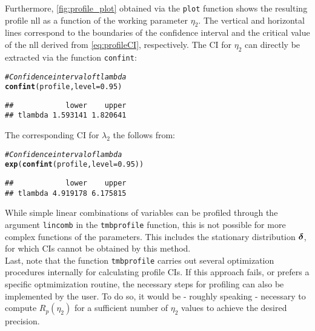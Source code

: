 \documentclass[bimj,fleqn]{w-art}\usepackage[]{graphicx}\usepackage[]{color}
\makeatletter
\newcommand{\hlnum}[1]{\textcolor[rgb]{0.686,0.059,0.569}{#1}}%
\newcommand{\hlcom}[1]{\textcolor[rgb]{0.678,0.584,0.686}{\textit{#1}}}%
\newcommand{\hlstd}[1]{\textcolor[rgb]{0.345,0.345,0.345}{#1}}%
\newcommand{\hlkwc}[1]{\textcolor[rgb]{0.333,0.667,0.333}{#1}}%
\newcommand{\hlkwd}[1]{\textcolor[rgb]{0.737,0.353,0.396}{\textbf{#1}}}%
\newenvironment{kframe}{%
 \def\at@end@of@kframe{}%
 \ifinner\ifhmode%
  \def\at@end@of@kframe{\end{minipage}}%
  \begin{minipage}{\columnwidth}%
 \fi\fi%
 \def\FrameCommand##1{\hskip\@totalleftmargin \hskip-\fboxsep
 \colorbox{shadecolor}{##1}\hskip-\fboxsep
     \hskip-\linewidth \hskip-\@totalleftmargin \hskip\columnwidth}%
 \MakeFramed {\advance\hsize-\width
   \@totalleftmargin\z@ \linewidth\hsize
   \@setminipage}}%
 {\par\unskip\endMakeFramed%
 \at@end@of@kframe}
\newenvironment{knitrout}{}{} %
\newcommand{\bfdelta}{\mbox{\boldmath $\delta$}}
\theoremstyle{plain}
\theoremstyle{definition}
\makeatother
\begin{document}
Furthermore, \autoref{fig:profile_plot} obtained via the \texttt{plot} function shows the resulting profile nll as a function of the working parameter $\eta_2$. The vertical and horizontal lines correspond to the boundaries of the confidence interval and the critical value of the nll derived from \autoref{eq:profileCI}, respectively. The CI for $\eta_2$ can directly be extracted via the function \texttt{confint}:
\begin{knitrout}
\color{fgcolor}\begin{kframe}
\begin{alltt}
\hlcom{# Confidence interval of tlambda}
\hlkwd{confint}\hlstd{(profile,} \hlkwc{level} \hlstd{=} \hlnum{0.95}\hlstd{)}
\end{alltt}
\begin{verbatim}
##            lower    upper
## tlambda 1.593141 1.820641
\end{verbatim}
\end{kframe}
\end{knitrout}
The corresponding CI for $\lambda_2$ the follows from:
\begin{knitrout}
\color{fgcolor}\begin{kframe}
\begin{alltt}
\hlcom{# Confidence interval of lambda}
\hlkwd{exp}\hlstd{(}\hlkwd{confint}\hlstd{(profile,} \hlkwc{level} \hlstd{=} \hlnum{0.95}\hlstd{))}
\end{alltt}
\begin{verbatim}
##            lower    upper
## tlambda 4.919178 6.175815
\end{verbatim}
\end{kframe}
\end{knitrout}
While simple linear combinations of variables can be profiled through the argument \texttt{lincomb} in the \texttt{tmbprofile} function, this is not possible for more complex functions of the parameters. This includes the stationary distribution $\bfdelta$, for which CIs cannot be obtained by this method.\\
Last, note that the function \texttt{tmbprofile} carries out several optimization procedures internally for calculating profile CIs. If this approach fails, or prefers a specific optmimization routine, the necessary steps for profiling can also be implemented by the user. To do so, it would be - roughly speaking - necessary to compute $R_p(\eta_2)$ for a sufficient number of $\eta_2$ values to achieve the desired precision.\\
\end{document}
